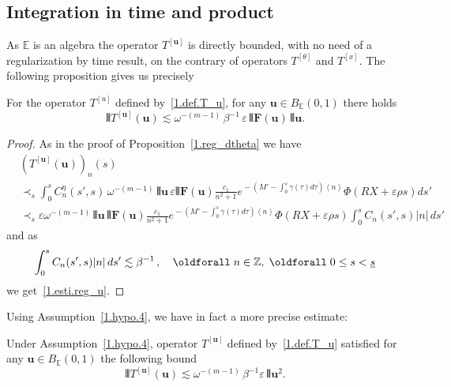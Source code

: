 \documentclass[AHL,Unicode,longabstracts,published]{cedram}
\theoremstyle{plain}
\newcommand*\e{\varepsilon}
\newcommand*\Z{{\mathbb Z}}
\newcommand*\EE{{\mathbb E}}
\newcommand*\g{\gamma}
\newcommand{\ubf}{{\mathbf u}}
\newcommand*\F{{\mathbf F}}
\newcommand*\dsp{\displaystyle}
\newcommand*\und{\underline}
\DeclarePairedDelimiter{\VERT}{|\mkern -1.6mu|\mkern -1.6mu|}{|\mkern -1.6mu|\mkern -1.6mu|}
\renewcommand*{\forall}{\mathrel{\oldforall}}
\begin{document}
\subsection{Integration in time and product}

As $\EE$ is an algebra the operator $T^{[\ubf]}$ is directly bounded, with no need of a regularization by time result, on the contrary of operators $T^{[\theta]}$ and $T^{[x]}$. The following proposition gives us precisely

\begin{prop}\label{1.reg_u}
For the operator $T^{[u]}$ defined by~\eqref{1.def.T_u}, for any $\ubf\in B_{\EE}(0,1)$ there holds
\begin{equation}\label{1.esti.reg_u}
\VERT{T^{[\ubf]}(\ubf)} \lesssim \omega^{-(m-1)}\,\beta^{-1}\, \e \, \VERT{\F(\ubf)} \, \VERT{\ubf}.
\end{equation}
\end{prop}

\begin{proof}
As in the proof of Proposition~\ref{1.reg_dtheta} we have
\begin{align*}
& \left(T^{[\ubf]}(\ubf)\right)_n(s) \\
& \prec_{s} \int_{0}^{s} C_n^{\eta}(s',s) \,\omega^{-(m-1)}\,\VERT{\ubf}\, \e\VERT{\F(\ubf)} \frac{\dsp c_1}{\dsp n^2+1}e^{{}- (M'- \int_{0}^{s} \g(\tau)d\tau) \left<n\right>} \Phi\left(R X+\e\rho s\right) ds' \\
& \prec_{s} \e \omega^{-(m-1)}\,\VERT{\ubf}\, \VERT{\F(\ubf)} \frac{\dsp c_1}{\dsp n^2+1}e^{{}- (M'- \int_{0}^{s} \g(\tau)d\tau) \left<n\right>} \Phi\left(R X+\e\rho s\right) \int_{0}^{s} C_n(s',s) |n| \, ds'
\end{align*}
and as
\[
\int_{0}^{s} C_n(s',s) |n| \, ds' \lesssim \beta^{-1} \,, \quad \forall n\in\Z,\; \forall 0 \leq s <\und{s}
\]
we get~\eqref{1.esti.reg_u}.
\end{proof}

Using Assumption~\ref{1.hypo.4}, we have in fact a more precise estimate:

\begin{coro}\label{1.coro.ref.du}
Under Assumption~\ref{1.hypo.4}, operator $T^{[\ubf]}$ defined by~\eqref{1.def.T_u} satisfied for any $\ubf\in B_{\EE}(0,1)$ the following bound
\begin{equation}\label{1.esti.reg_u.bis}
\VERT{T^{[\ubf]}(\ubf)} \lesssim \omega^{-(m-1)}\, \beta^{-1} \e \, \VERT{\ubf}^2.
\end{equation}
\end{coro}
\end{document}
